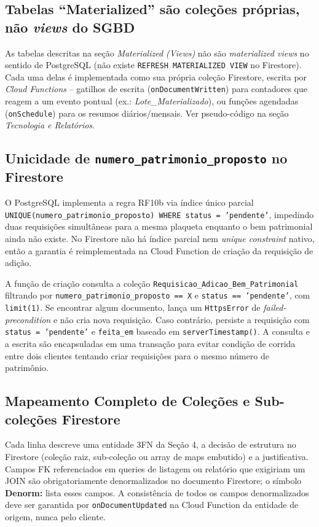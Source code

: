 \documentclass[12pt,a4paper]{article}
\begin{document}
\subsection{Tabelas ``Materialized'' são coleções próprias, não \textit{views} do SGBD}
As tabelas descritas na seção \textit{Materialized (Views)} não são \textit{materialized views} no sentido de PostgreSQL (não existe \texttt{REFRESH MATERIALIZED VIEW} no Firestore). Cada uma delas é implementada como sua própria coleção Firestore, escrita por \textit{Cloud Functions} -- gatilhos de escrita (\texttt{onDocumentWritten}) para contadores que reagem a um evento pontual (ex.: \textit{Lote\_Materializado}), ou funções agendadas (\texttt{onSchedule}) para os resumos diários/mensais. Ver pseudo-código na seção \textit{Tecnologia e Relatórios}.

\subsection{Unicidade de \texttt{numero\_patrimonio\_proposto} no Firestore}
O PostgreSQL implementa a regra RF10b via índice único parcial
\texttt{UNIQUE(numero\_patrimonio\_proposto) WHERE status = 'pendente'},
impedindo duas requisições simultâneas para a mesma plaqueta enquanto
o bem patrimonial ainda não existe. No Firestore não há índice parcial
nem \emph{unique constraint} nativo, então a garantia é reimplementada
na Cloud Function de criação da requisição de adição.

A função de criação consulta a coleção
\texttt{Requisicao\_Adicao\_Bem\_Patrimonial} filtrando por
\texttt{numero\_patrimonio\_proposto == X} e
\texttt{status == 'pendente'}, com \texttt{limit(1)}. Se encontrar
algum documento, lança um \texttt{HttpsError} de \emph{failed-precondition}
e não cria nova requisição. Caso contrário, persiste a requisição com
\texttt{status = 'pendente'} e \texttt{feita\_em} baseado em
\texttt{serverTimestamp()}. A consulta e a escrita são encapsuladas
em uma transação para evitar condição de corrida entre dois clientes
tentando criar requisições para o mesmo número de patrimônio.
\subsection{Mapeamento Completo de Coleções e Sub-coleções Firestore}
\label{subsec:mapeamento-colecoes}

\begin{explicacao}
Cada linha descreve uma entidade 3FN da Seção 4, a decisão de estrutura no Firestore (coleção raiz, sub-coleção ou array de maps embutido) e a justificativa. Campos FK referenciados em queries de listagem ou relatório que exigiriam um JOIN são obrigatoriamente denormalizados no documento Firestore; o símbolo \textbf{Denorm:} lista esses campos. A consistência de todos os campos denormalizados deve ser garantida por \texttt{onDocumentUpdated} na Cloud Function da entidade de origem, nunca pelo cliente.
\end{explicacao}
\end{document}
